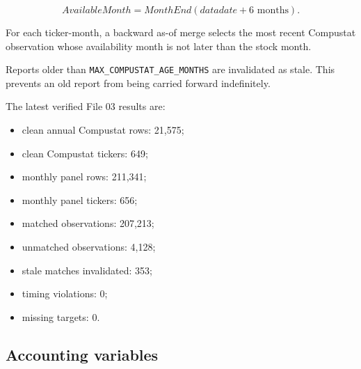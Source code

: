 \documentclass[11pt,a4paper]{article}
\newcommand{\code}[1]{\texttt{#1}}
\begin{document}
\[
  AvailableMonth
  =
  MonthEnd(datadate+6\text{ months}).
\]

For each ticker-month, a backward as-of merge selects the most recent Compustat
observation whose availability month is not later than the stock month.

Reports older than \code{MAX\_COMPUSTAT\_AGE\_MONTHS} are invalidated as stale.
This prevents an old report from being carried forward indefinitely.

The latest verified File 03 results are:

\begin{itemize}
  \item clean annual Compustat rows: 21,575;
  \item clean Compustat tickers: 649;
  \item monthly panel rows: 211,341;
  \item monthly panel tickers: 656;
  \item matched observations: 207,213;
  \item unmatched observations: 4,128;
  \item stale matches invalidated: 353;
  \item timing violations: 0;
  \item missing targets: 0.
\end{itemize}

\subsection{Accounting variables}
\end{document}
